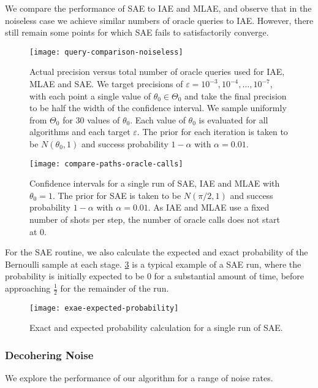 We compare the performance of SAE to IAE and MLAE, and observe that in the noiseless case we achieve similar numbers of oracle queries to IAE. However, there still remain some points for which SAE fails to satisfactorily converge.

\begin{figure}[htbp]
	\centering
	\texttt{[image: query-comparison-noiseless]}
	\caption{Actual precision versus total number of oracle queries used for IAE, MLAE and SAE. We target precisions of $\varepsilon = 10^{-3}, 10^{-4}, \ldots , 10^{-7}$, with each point a single value of $\theta_0 \in \Theta_0$ and take the final precision to be half the width of the confidence interval. We sample uniformly from $\Theta_0$ for 30 values of $\theta_0$. Each value of $\theta_0$ is evaluated for all algorithms and each target $\varepsilon$. The prior for each iteration is taken to be $N(\theta_0, 1)$ and success probability $1 - \alpha$ with $\alpha = 0.01$.}
	\label{fig::query-comparison-noiseless}
\end{figure}


\begin{figure}[htbp]
	\centering
	\texttt{[image: compare-paths-oracle-calls]}
	\caption{Confidence intervals for a single run of SAE, IAE and MLAE with $\theta_0 = 1$. The prior for SAE is taken to be $N(\pi/2, 1)$ and success probability $1 - \alpha$ with $\alpha = 0.01$. As IAE and MLAE use a fixed number of shots per step, the number of oracle calls does not start at 0.}
	\label{fig::compare-paths-oracle-calls}
\end{figure}

For the SAE routine, we also calculate the expected and exact probability of the Bernoulli sample at each stage. \ref{fig::exae-expected-probability} is a typical example of a SAE run, where the probability is initially expected to be 0 for a substantial amount of time, before approaching $\frac{1}{2}$ for the remainder of the run.

\begin{figure}[htpb]
	\centering
	\texttt{[image: exae-expected-probability]}
	\caption{Exact and expected probability calculation for a single run of SAE.}
	\label{fig::exae-expected-probability}
\end{figure}

\subsubsection{Decohering Noise}
We explore the performance of our algorithm for a range of noise rates.

